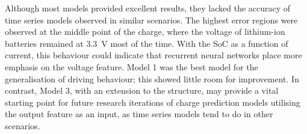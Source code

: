 %
%
Although most models provided excellent results, they lacked the accuracy of time series models observed in similar scenarios.
The highest error regions were observed at the middle point of the charge, where the voltage of lithium-ion batteries remained at 3.3~V most of the time.
With the SoC as a function of current, this behaviour could indicate that recurrent neural networks place more emphasis on the voltage feature.
Model 1 was the best model for the generalisation of driving behaviour; this showed little room for improvement.
In contrast, Model 3, with an extension to the structure, may provide a vital starting point for future research iterations of charge prediction models utilising the output feature as an input, as time series models tend to do in other scenarios.
